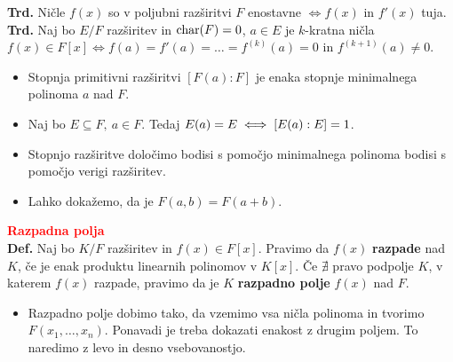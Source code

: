 \documentclass[a4paper,oneside,8pt,landscape]{extarticle}
\begin{document}
\begin{multicols*}{3}
%
\textbf{Trd.} Ničle $f(x)$ so v poljubni razširitvi $F$ enostavne $\iff f(x)$ in $f'(x)$ tuja.\\
%
\textbf{Trd.} Naj bo $E/F$ razširitev in $\operatorname{char}(F)=0$, $a\in E$ je $k$-kratna ničla $f(x)\in F[x] \iff f(a) = f'(a) =\dots = f^{(k)}(a) =0$ in $f^{(k+1)}(a)\neq 0$.
%
\begin{itemize}
    \item Stopnja primitivni razširitvi \([F(a):F]\) je enaka stopnje minimalnega polinoma \(a\) nad \(F\).
    \item Naj bo \(E \subseteq F,\ a \in F\). Tedaj \(E(a) = E \iff [E(a):E] = 1\).
    \item Stopnjo razširitve določimo bodisi s pomočjo minimalnega polinoma bodisi s pomočjo verigi razširitev.
    \item Lahko dokažemo, da je \(F(a, b) = F(a+b)\).
\end{itemize}
%
%
\textbf{\textcolor{red}{Razpadna polja}}\\
\textbf{Def.} Naj bo $K/F$ razširitev in $f(x)\in F[x]$. Pravimo da $f(x)$ \textbf{razpade} nad $K$, če je enak produktu linearnih polinomov v $K[x]$. Če $\nexists$ pravo podpolje $K$, v katerem $f(x)$ razpade, pravimo da je $K$ \textbf{razpadno polje} $f(x)$ nad $F$.
\begin{itemize}
    \item Razpadno polje dobimo tako, da vzemimo vsa ničla polinoma in tvorimo \(F(x_1, \ldots, x_n)\). Ponavadi je treba dokazati enakost z drugim poljem. To naredimo z levo in desno vsebovanostjo.
\end{itemize}

\end{multicols*}
\end{document}

